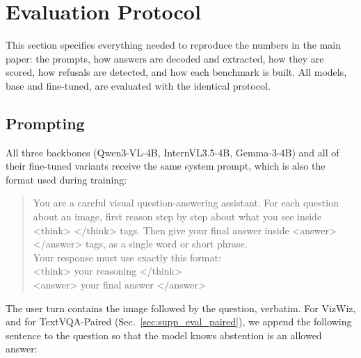 \clearpage
\setcounter{page}{1}
\maketitlesupplementary
\appendix
\renewcommand{\thetable}{S\arabic{table}}
\renewcommand{\thefigure}{S\arabic{figure}}
\setcounter{table}{0}
\setcounter{figure}{0}
\renewcommand{\thealgorithm}{S\arabic{algorithm}}
\setcounter{algorithm}{0}
\section{Evaluation Protocol}
\label{sec:supp_eval}

This section specifies everything needed to reproduce the numbers in the main paper:
the prompts, how answers are decoded and extracted, how they are scored, how refusals
are detected, and how each benchmark is built. All models, base and fine-tuned, are
evaluated with the identical protocol.

\subsection{Prompting}
\label{sec:supp_eval_prompt}

All three backbones (Qwen3-VL-4B, InternVL3.5-4B, Gemma-3-4B) and all of their
fine-tuned variants receive the same system prompt, which is also the format used during
training:

\begin{quote}\small\ttfamily
You are a careful visual question-answering assistant. For each question about an
image, first reason step by step about what you see inside <think> </think> tags.
Then give your final answer inside <answer> </answer> tags, as a single word or short
phrase.\\
Your response must use exactly this format:\\
<think> your reasoning </think>\\
<answer> your final answer </answer>
\end{quote}

The user turn contains the image followed by the question, verbatim. For VizWiz, and for
TextVQA-Paired (Sec.~\ref{sec:supp_eval_paired}), we append the following sentence to the
question so that the model knows abstention is an allowed answer:


